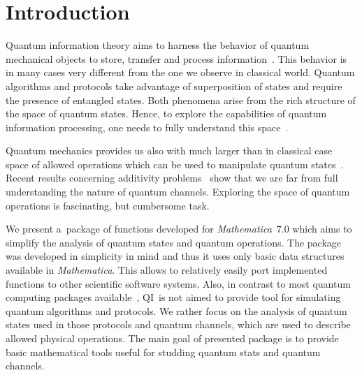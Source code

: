 \documentclass[final,3p,times]{elsarticle}
\newcommand{\Mathematica}{\emph{Mathematica}}
\newcommand{\1}{{\rm 1\hspace{-0.9mm}l}}
\newcommand{\qi}{QI}
\begin{document}
\tableofcontents


\section{Introduction}\label{sec:intro}
Quantum information theory aims to harness the behavior of quantum mechanical
objects to store, transfer and process information~\cite{hayashi}. This behavior
is in many cases very different from the one we observe in classical world.
Quantum algorithms and protocols take advantage of superposition of states and
require the presence of entangled states. Both phenomena arise from the rich
structure of the space of quantum states. Hence, to explore the capabilities of
quantum information processing, one needs to fully understand this
space~\cite{BZ06}. 

Quantum mechanics provides us also with much larger than in classical case space
of allowed operations which can be used to manipulate quantum
states~\cite{hayashi,BZ06}. Recent results concerning additivity
problems~\cite{hastings09superadditivity} show that we are far from full
understanding the nature of quantum channels. Exploring the space of quantum
operations is fascinating, but cumbersome task.


We present a~package of functions developed for \Mathematica\ 7.0 which aims to
simplify the analysis of quantum states and quantum operations. The package was 
developed in simplicity in mind and thus it uses only basic data structures
available in \Mathematica. This allows to relatively easily port implemented
functions to other scientific software systems. Also, in contrast to most
quantum computing packages available~\cite{qdensity,qucalc,quantum2}, \qi\ is
not aimed to provide tool for simulating quantum algorithms and protocols. We
rather focus on the analysis of quantum states used in those protocols and
quantum channels, which are used to describe allowed physical operations. The
main goal of presented package is to provide basic mathematical tools useful for
studding quantum stats and quantum channels.
\end{document}
